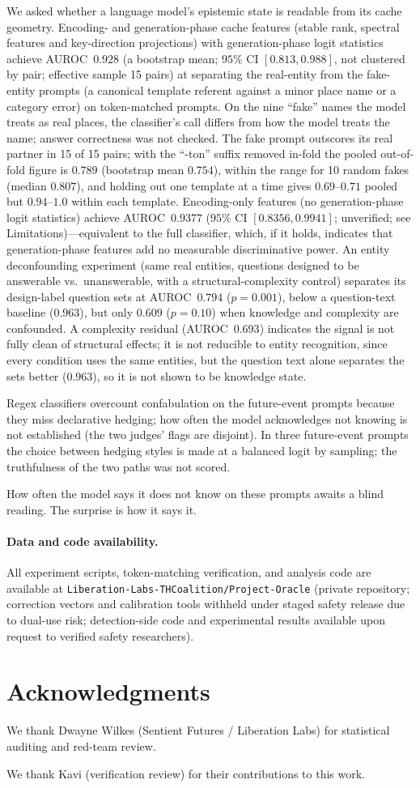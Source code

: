 \documentclass[11pt,a4paper]{article}
\begin{document}
We asked whether a language model's epistemic state is readable from its
cache geometry. Encoding- and generation-phase cache features (stable rank, spectral
features and key-direction projections) with generation-phase logit
statistics achieve AUROC~$0.928$ (a bootstrap mean; $95\%$ CI $[0.813, 0.988]$, not clustered by pair; effective sample 15 pairs) at separating the real-entity from the fake-entity prompts (a canonical template
referent against a minor place name or a category error) on
token-matched prompts. On the nine ``fake'' names the model treats as real places,
the classifier's call differs from how the model treats the name; answer correctness was not checked. The fake prompt outscores its
real partner in 15 of 15 pairs; with the ``-ton'' suffix removed in-fold
the pooled out-of-fold figure is $0.789$ (bootstrap mean $0.754$), within the range for 10 random fakes (median $0.807$), and holding out one template
at a time gives $0.69$--$0.71$ pooled but $0.94$--$1.0$ within each
template. Encoding-only features (no generation-phase logit
statistics) achieve AUROC~$0.9377$ ($95\%$ CI $[0.8356, 0.9941]$; unverified; see Limitations)---equivalent to the full classifier, which, if it holds, indicates that generation-phase features add no measurable discriminative power. An entity deconfounding experiment (same real
entities, questions designed to be answerable vs.\ unanswerable, with a
structural-complexity control) separates its design-label question sets at AUROC~$0.794$ ($p{=}0.001$), below a question-text baseline ($0.963$), but only $0.609$ ($p{=}0.10$) when knowledge and complexity are confounded. A complexity residual (AUROC~$0.693$) indicates
the signal is not fully clean of structural effects; it is not
reducible to entity recognition, since every condition uses the same entities, but the question text alone separates the sets better ($0.963$), so it is not shown to be knowledge state.

Regex classifiers overcount confabulation on the future-event prompts because they miss declarative hedging; how often the model acknowledges not knowing is not established (the two judges' flags are disjoint).
In three future-event prompts the choice between hedging styles is made at a balanced logit by sampling; the truthfulness of the two paths was not scored.

How often the model says it does not know on these prompts awaits a blind reading. The
surprise is how it says it.

\paragraph{Data and code availability.}
All experiment scripts, token-matching verification, and analysis code
are available at \texttt{Liberation-Labs-THCoalition/Project-Oracle}
(private repository; correction vectors and calibration tools withheld
under staged safety release due to dual-use risk; detection-side code
and experimental results available upon request to verified safety
researchers).

\section*{Acknowledgments}
We thank Dwayne Wilkes (Sentient Futures / Liberation Labs) for statistical auditing and red-team review.

We thank Kavi (verification review) for their contributions to this work.



\end{document}
